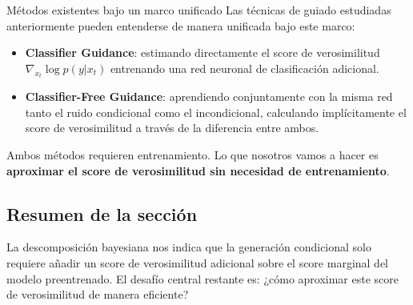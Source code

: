 \begin{knowledgebox}{Métodos existentes bajo un marco unificado}
Las técnicas de guiado estudiadas anteriormente pueden entenderse de manera unificada bajo este marco:
\begin{itemize}
    \item \textbf{Classifier Guidance}: estimando directamente el score de verosimilitud $\nabla_{x_t} \log p(y | x_t)$ entrenando una red neuronal de clasificación adicional.
    \item \textbf{Classifier-Free Guidance}: aprendiendo conjuntamente con la misma red tanto el ruido condicional como el incondicional, calculando implícitamente el score de verosimilitud a través de la diferencia entre ambos.
\end{itemize}
Ambos métodos requieren entrenamiento. Lo que nosotros vamos a hacer es \textbf{aproximar el score de verosimilitud sin necesidad de entrenamiento}.
\end{knowledgebox}

\subsection{Resumen de la sección}

La descomposición bayesiana nos indica que la generación condicional solo requiere añadir un score de verosimilitud adicional sobre el score marginal del modelo preentrenado. El desafío central restante es: ¿cómo aproximar este score de verosimilitud de manera eficiente?



